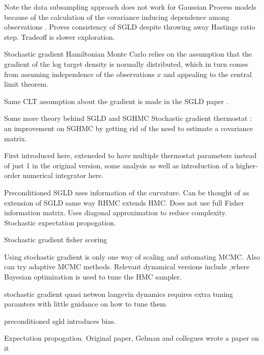 \documentclass{book}
\begin{document}
\begin{enumerate}
Note the data subsampling approach does not work for Gaussian Process models because of the calculation of the covariance inducing dependence among observations \cite{filippone2015enabling}.
\cite{teh2014consistency}
Proves consistency of SGLD despite throwing away Hastings ratio step. Tradeoff is slower exploration.

Stochastic gradient Hamiltonian Monte Carlo \cite{chen2014stochastic}
relies on the assumption that the gradient of the log target density is normally distributed, which in turn comes from assuming independence of the observations $x$ and appealing to the central limit theorem.

Same CLT assumption about the gradient is made in
the SGLD paper \cite{welling2011bayesian}.

Some more theory behind SGLD and SGHMC \cite{ma2015complete}
Stochastic gradient thermostat : an improvement on SGHMC by getting rid of the need to estimate a covariance matrix. 

First introduced here\cite{ding2014bayesian}, exteneded\cite{gan2015scalable} to have multiple thermostat parameters instead of just 1 in the original version, some analysis as well as introduction of a higher-order numerical integrator here\cite{li2015high,chen2015convergence}.

Preconditioned SGLD \cite{li2015preconditioned} uses information of the curvature. Can be thought of as extension of SGLD same way RHMC extends HMC. Does not use full Fisher information matrix. Uses diagonal approximation to reduce complexity.
Stochastic expectation propogation.

Stochastic gradient fisher scoring \cite{ahn2012bayesian}

Using stochastic gradient is only one way of scaling and automating MCMC. Also can try adaptive MCMC methods\cite{roberts2009examples}. Relevant dynamical versions include \cite{wang2013adaptive},where Bayesian optimization \cite{mahendran2012adaptive,snoek2012practicalx,} is used to tune the HMC sampler.

stochastic gradient quasi netwon langevin dynamics requires extra tuning paramters with little guidance on how to tune them \cite{csimcsekli2016stochastic}

preconditioned sgld introduces bias\cite{li2015preconditioned}.

Expectation propogation. Original paper\cite{minka2001expectation}, Gelman and collegues wrote a paper on it \cite{gelman2014expectation}


\end{enumerate}
\end{document}
